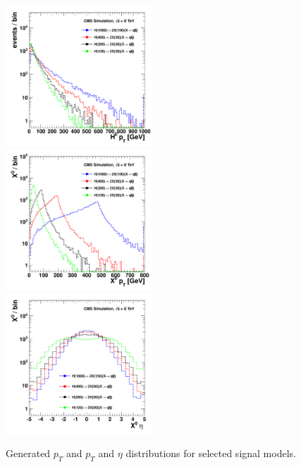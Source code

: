 \begin{figure}[htbp]
\centering
\includegraphics[width=0.495\textwidth]{plots/signal/hpt.pdf}
\includegraphics[width=0.495\textwidth]{plots/signal/xpt.pdf}
\includegraphics[width=0.495\textwidth]{plots/signal/xeta.pdf}
\caption{Generated \Higgs $p_T$ and \X $p_T$ and $\eta$ distributions for selected signal models.\label{fig:sigHX}}
\end{figure} 

